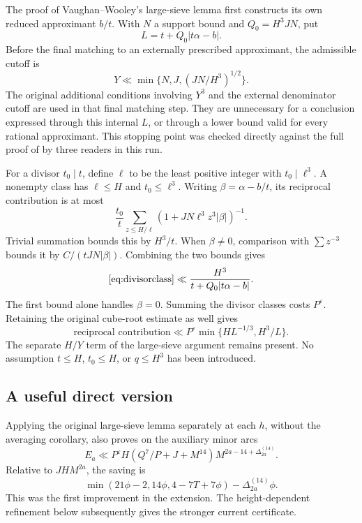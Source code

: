 \documentclass[11pt,letterpaper]{article}
\theoremstyle{remark}
\newcommand{\eps}{\varepsilon}
\begin{document}
The proof of Vaughan--Wooley's large-sieve lemma first constructs its own reduced
approximant $b/t$. With $N$ a support bound and $Q_0=H^3JN$, put
\[
 L=t+Q_0|t\alpha-b|.
\]
Before the final matching to an externally prescribed approximant, the admissible
cutoff is
\[
 Y\ll\min\{N,J,(JN/H^3)^{1/2}\}.
\]
The original additional conditions involving $Y^3$ and the external denominator
cutoff are used in that final matching step. They are unnecessary for a conclusion
expressed through this internal $L$, or through a lower bound valid for every
rational approximant. This stopping point was checked directly against the full
proof of \cite[Lemma~4.5]{VW95} by three readers in this run.

For a divisor $t_0\mid t$, define $\ell$ to be the least positive integer with
$t_0\mid\ell^3$. A nonempty class has $\ell\le H$ and $t_0\le\ell^3$.
Writing $\beta=\alpha-b/t$, its reciprocal contribution is at most
\begin{equation}\label{eq:divisorclass}
 \frac{t_0}{t}\sum_{z\le H/\ell}
              (1+JN\ell^3z^3|\beta|)^{-1}.
\end{equation}
Trivial summation bounds this by $H^3/t$. When $\beta\ne0$, comparison with
$\sum z^{-3}$ bounds it by $C/(tJN|\beta|)$. Combining the two bounds gives
\[
 \eqref{eq:divisorclass}\ll \frac{H^3}{t+Q_0|t\alpha-b|}.
\]
The first bound alone handles $\beta=0$. Summing the divisor classes costs
$P^\eps$. Retaining the original cube-root estimate as well gives
\begin{equation}\label{eq:reciprocal}
 \text{reciprocal contribution}\ll
 P^\eps\min\{H L^{-1/3},H^3/L\}.
\end{equation}
The separate $H/Y$ term of the large-sieve argument remains present. No assumption
$t\le H$, $t_0\le H$, or $q\le H^3$ has been introduced.

\subsection{A useful direct version}

Applying the original large-sieve lemma separately at each $h$, without the averaging
corollary, also proves on the auxiliary minor arcs
\[
 E_a\ll P^\eps H(Q^7/P+J+M^{14})
              M^{2a-14+\Delta_{2a}^{(14)}}.
\]
Relative to $JHM^{2a}$, the saving is
\[
 \min(21\phi-2,14\phi,4-7T+7\phi)
                         -\Delta_{2a}^{(14)}\phi.
\]
This was the first improvement in the extension. The height-dependent refinement
below subsequently gives the stronger current certificate.
\end{document}
